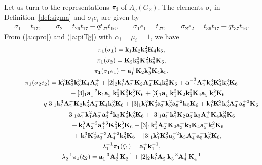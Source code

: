\documentclass[pdftex]{sigma}
\def\bk{{\bf k}}
\def\bK{{\bf K}}
\def\am{{{\bf a}^-}}
\begin{document}
Let us turn to the representations $\pi_{{\bf i}}$ of $A_q(G_2)$.
The elements $\sigma_i$ in Def\/inition~\ref{def:sigma}
and $\sigma_ie_i$
are given by
\begin{gather}\label{g:kobetsu}
\sigma_1 = t_{17}, \qquad
\sigma_2 = t_{26}t_{17}-qt_{27}t_{16},\qquad
\sigma_1 e_1 = t_{27},\qquad
\sigma_2e_2 = t_{36}t_{17}-qt_{37}t_{16}.
\end{gather}
From (\ref{a:cpro}) and (\ref{a:piTg}) with $\alpha_i=\mu_i=1$, we have
\begin{gather*}
\pi_{\bf 1}(\sigma_1)=\bk_1 \bK_2 \bk^{2}_3 \bK_4 \bk_5,\\
\pi_{\bf 1}(\sigma_2)=\bK_2 \bk^{3}_3 \bK^{2}_4 \bk^{3}_5 \bK_6,\\
\pi_{\bf 1}(\sigma_1e_1)={\bf a}^+_1 \bK_2 \bk^{2}_3 \bK_4 \bk_5,\\
\pi_{\bf 1}(\sigma_2e_2)=\bk^{3}_1 \bK^{2}_2 \bk^{3}_3 \bK_4 {\bf A}^+_6
 + [2]_2 \bk^{3}_1 {\bf A}^-_2 \bK_2 {\bf A}^+_4 \bK_4 \bk^{3}_5 \bK_6
 + \am_1^3 {\bf A}^+_2 \bk^{3}_3 \bK^{2}_4 \bk^{3}_5 \bK_6\\
 \hphantom{\pi_{\bf 1}(\sigma_2e_2)=}{}
 + [3]_1 {\bf a}_1^{-2} \bk_1 {\bf a}^+_3 \bk^{2}_3 \bK^{2}_4 \bk^{3}_5 \bK_6
 + [3]_1 {\bf a}^-_1 \bk^{2}_1 \bK_2 \bk^{2}_3 \bK_4 {\bf a}^+_5 \bk^{2}_5 \bK_6\\
 \hphantom{\pi_{\bf 1}(\sigma_2e_2)=}{}
 - q [3]_1 \bk^{3}_1 {\bf A}^-_2 \bK_2 \bk^{2}_3 {\bf A}^+_4 \bK_4 \bk^{3}_5 \bK_6
 + [3]_1 \bk^{3}_1 \bK^{2}_2 {\bf a}^-_3 \bk^{2}_3 {\bf a}_5^{+2} \bk_5 \bK_6
 + \bk^{3}_1 \bK^{2}_2 \bk^{3}_3 {\bf A}^-_4 {\bf a}_5^{+3} \bK_6\\
 \hphantom{\pi_{\bf 1}(\sigma_2e_2)=}{}
 + [3]_1 {\bf a}^-_1 \bk^{2}_1 {\bf A}^-_2 {\bf a}_3^{+2} \bk_3 \bK^{2}_4 \bk^{3}_5 \bK_6
 + [3]_1 {\bf a}^-_1 \bk^{2}_1 \bK_2 {\bf a}^-_3 \bk_3 {\bf A}^+_4 \bK_4 \bk^{3}_5 \bK_6\\
\hphantom{\pi_{\bf 1}(\sigma_2e_2)=}{}
 + \bk^{3}_1 {\bf A}_2^{-2} {\bf a}_3^{+3} \bK^{2}_4 \bk^{3}_5 \bK_6
 + [3]_1 \bk^{3}_1 {\bf A}^-_2 \bK_2 {\bf a}^+_3 \bk_3 \bK_4 {\bf a}^+_5 \bk^{2}_5 \bK_6\\
\hphantom{\pi_{\bf 1}(\sigma_2e_2)=}{}
 + \bk^{3}_1 \bK^{2}_2 {\bf a}_3^{-3} {\bf A}_4^{+2} \bk^{3}_5 \bK_6
 + [3]_1 \bk^{3}_1 \bK^{2}_2 {\bf a}_3^{-2} \bk_3 {\bf A}^+_4 {\bf a}^+_5 \bk^{2}_5 \bK_6,\\
\lambda_1^{-1}\pi_{\bf 1}(\xi_1)={\bf a}^+_1 \bk^{-1}_1,\\
\lambda_2^{-1}\pi_{\bf 1}(\xi_2)={\bf a}_1^{-3} {\bf A}^+_2 \bK^{-1}_2
 + [2]_2 \bk^{3}_1 {\bf A}^-_2 \bk^{-3}_3 {\bf A}^+_4 \bK^{-1}_4

\end{gather*}
\end{document}
